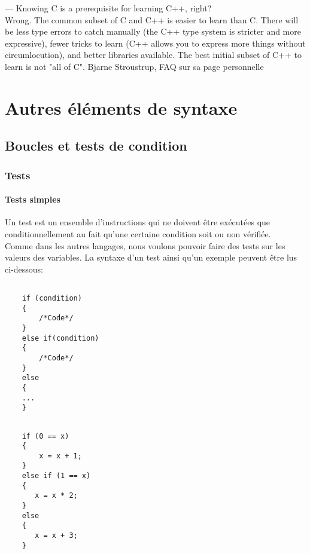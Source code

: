 \begin{savequote}
--- Knowing C is a prerequisite for learning C++, right?\\

Wrong. The common subset of C and C++ is easier to learn than C. There will be
less type errors to catch manually (the C++ type system is stricter and more
expressive), fewer tricks to learn (C++ allows you to express more things
without circumlocution), and better libraries available.  The best initial
subset of C++ to learn is not "all of C".  Bjarne Stroustrup, FAQ sur
sa page personnelle \end{savequote}

\chapter{Autres \'el\'ements de syntaxe }
\label{chapter:elementsdesyntaxe}

\section{Boucles et tests de condition}
\subsection{Tests}
\subsubsection{Tests simples}

Un test est un ensemble d'instructions qui ne doivent être exécutées que conditionnellement au fait qu'une certaine condition soit ou non vérifiée.\\

Comme dans les autres langages, nous voulons pouvoir faire des tests
sur les valeurs des variables. La syntaxe d'un test ainsi qu'un exemple peuvent \^etre lus ci-dessous:\\

\begin{DDbox}{\linewidth}
\begin{minipage}{0.45\linewidth}
    \begin{lstlisting}[caption=Syntaxe d'un test]

    if (condition)
    {
        /*Code*/
    }
    else if(condition)
    {
        /*Code*/
    }
    else
    {
    ...
    }

    \end{lstlisting}
\end{minipage}
\qquad
\begin{minipage}{0.45\linewidth}
    \begin{lstlisting}[caption=Exemple de test]

    if (0 == x)
    {
        x = x + 1;
    }
    else if (1 == x)
    {
       x = x * 2;
    }
    else
    {
       x = x + 3;
    }

    \end{lstlisting}
\end{minipage}
\end{DDbox}

